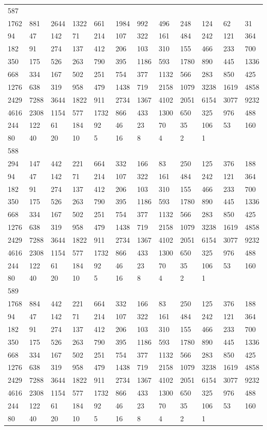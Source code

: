 \begin{longtable}{llllllllllll}
587&&&&&&&&&&&\\
1762& 881& 2644& 1322& 661& 1984& 992& 496& 248& 124& 62& 31\\
94& 47& 142& 71& 214& 107& 322& 161& 484& 242& 121& 364\\
182& 91& 274& 137& 412& 206& 103& 310& 155& 466& 233& 700\\
350& 175& 526& 263& 790& 395& 1186& 593& 1780& 890& 445& 1336\\
668& 334& 167& 502& 251& 754& 377& 1132& 566& 283& 850& 425\\
1276& 638& 319& 958& 479& 1438& 719& 2158& 1079& 3238& 1619& 4858\\
2429& 7288& 3644& 1822& 911& 2734& 1367& 4102& 2051& 6154& 3077& 9232\\
4616& 2308& 1154& 577& 1732& 866& 433& 1300& 650& 325& 976& 488\\
244& 122& 61& 184& 92& 46& 23& 70& 35& 106& 53& 160\\
80& 40& 20& 10& 5& 16& 8& 4& 2& 1& \\

588&&&&&&&&&&&\\
294& 147& 442& 221& 664& 332& 166& 83& 250& 125& 376& 188\\
94& 47& 142& 71& 214& 107& 322& 161& 484& 242& 121& 364\\
182& 91& 274& 137& 412& 206& 103& 310& 155& 466& 233& 700\\
350& 175& 526& 263& 790& 395& 1186& 593& 1780& 890& 445& 1336\\
668& 334& 167& 502& 251& 754& 377& 1132& 566& 283& 850& 425\\
1276& 638& 319& 958& 479& 1438& 719& 2158& 1079& 3238& 1619& 4858\\
2429& 7288& 3644& 1822& 911& 2734& 1367& 4102& 2051& 6154& 3077& 9232\\
4616& 2308& 1154& 577& 1732& 866& 433& 1300& 650& 325& 976& 488\\
244& 122& 61& 184& 92& 46& 23& 70& 35& 106& 53& 160\\
80& 40& 20& 10& 5& 16& 8& 4& 2& 1& \\

589&&&&&&&&&&&\\
1768& 884& 442& 221& 664& 332& 166& 83& 250& 125& 376& 188\\
94& 47& 142& 71& 214& 107& 322& 161& 484& 242& 121& 364\\
182& 91& 274& 137& 412& 206& 103& 310& 155& 466& 233& 700\\
350& 175& 526& 263& 790& 395& 1186& 593& 1780& 890& 445& 1336\\
668& 334& 167& 502& 251& 754& 377& 1132& 566& 283& 850& 425\\
1276& 638& 319& 958& 479& 1438& 719& 2158& 1079& 3238& 1619& 4858\\
2429& 7288& 3644& 1822& 911& 2734& 1367& 4102& 2051& 6154& 3077& 9232\\
4616& 2308& 1154& 577& 1732& 866& 433& 1300& 650& 325& 976& 488\\
244& 122& 61& 184& 92& 46& 23& 70& 35& 106& 53& 160\\
80& 40& 20& 10& 5& 16& 8& 4& 2& 1& \\


\end{longtable}
